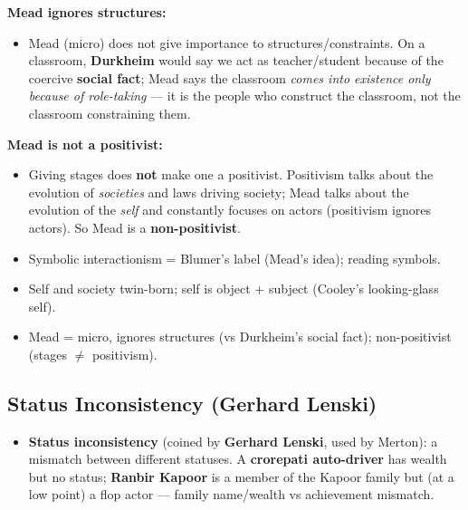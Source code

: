 \begin{CriticalPoint}
\textbf{Mead ignores structures:}
\begin{itemize}
\item Mead (micro) does not give importance to structures/constraints. On a classroom, \textbf{Durkheim} would say we act as teacher/student because of the coercive \textbf{social fact}; Mead says the classroom \textit{comes into existence only because of role-taking} --- it is the people who construct the classroom, not the classroom constraining them.
\end{itemize}
\end{CriticalPoint}

\begin{CriticalPoint}
\textbf{Mead is not a positivist:}
\begin{itemize}
\item Giving stages does \textbf{not} make one a positivist. Positivism talks about the evolution of \textit{societies} and laws driving society; Mead talks about the evolution of the \textit{self} and constantly focuses on actors (positivism ignores actors). So Mead is a \textbf{non-positivist}.
\end{itemize}
\end{CriticalPoint}

\begin{QuickRevision}
\begin{itemize}
\item Symbolic interactionism = Blumer's label (Mead's idea); reading symbols.
\item Self and society twin-born; self is object + subject (Cooley's looking-glass self).
\item Mead = micro, ignores structures (vs Durkheim's social fact); non-positivist (stages $\neq$ positivism).
\end{itemize}
\end{QuickRevision}

\sectiondivider

\subsection{Status Inconsistency (Gerhard Lenski)}

\begin{KeyConcept}
\begin{itemize}
\item \textbf{Status inconsistency} (coined by \textbf{Gerhard Lenski}, used by Merton): a mismatch between different statuses. A \textbf{crorepati auto-driver} has wealth but no status; \textbf{Ranbir Kapoor} is a member of the Kapoor family but (at a low point) a flop actor --- family name/wealth vs achievement mismatch.
\end{itemize}
\end{KeyConcept}

